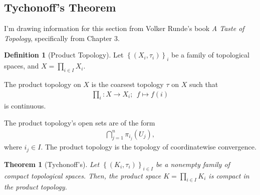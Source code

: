 \documentclass[12pt]{extarticle}
\newcommand{\set}[1]{\left\{#1\right\}}
\theoremstyle{plain}
\newtheorem*{theorem}{Theorem}
\theoremstyle{definition}
\newtheorem*{definition}{Definition}
\theoremstyle{note}
\renewcommand{\newline}{\hfill\break}
\begin{document}
\subsection{Tychonoff's Theorem}%
I'm drawing information for this section from Volker Runde's book \textit{A Taste of Topology}, specifically from Chapter 3.
\begin{definition}[Product Topology]
  Let $\set{\left(X_{i},\tau_{i}\right)}_{i}$ be a family of topological spaces, and $\displaystyle X = \prod_{i\in I}X_i$.\newline

  The product topology on $X$ is the coarsest topology $\tau$ on $X$ such that
  \begin{align*}
    \prod_{i}: X \rightarrow X_i;~~f\mapsto f(i)
  \end{align*}
  is continuous.
\end{definition}
The product topology's open sets are of the form
\begin{align*}
  \bigcap_{j=1}^{n}\pi_{i_j}\left(U_j\right),
\end{align*}
where $i_{j}\in I$. The product topology is the topology of coordinatewise convergence.
\begin{theorem}[Tychonoff's]
  Let $\set{\left(K_i,\tau_i\right)}_{i\in I}$ be a nonempty family of compact topological spaces. Then, the product space $\displaystyle K = \prod_{i\in I}K_i$ is compact in the product topology.
\end{theorem}
\end{document}
